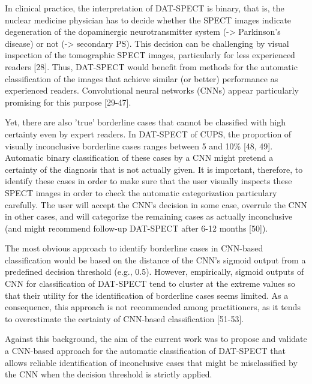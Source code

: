 In clinical practice, the interpretation of DAT-SPECT is binary, that is, the nuclear medicine physician has to decide whether the SPECT images 
indicate degeneration of the dopaminergic neurotransmitter system (-> Parkinson's disease) or not (-> secondary PS). 
This decision can be challenging by visual inspection of the tomographic SPECT images, particularly for less experienced readers [28]. 
Thus, DAT-SPECT would benefit from methods for the automatic classification of the images that achieve similar (or better) performance as experienced readers. 
Convolutional neural networks (CNNs) appear particularly promising for this purpose [29-47].

Yet, there are also 'true' borderline cases that cannot be classified with high certainty even by expert readers. 
In DAT-SPECT of CUPS, the proportion of visually inconclusive borderline cases ranges between 5 and 10\% [48, 49]. 
Automatic binary classification of these cases by a CNN might pretend a certainty of the diagnosis that is not actually given. 
It is important, therefore, to identify these cases in order to make sure that the user visually inspects these SPECT images 
in order to check the automatic categorization particulary carefully. 
The user will accept the CNN's decision in some case, overrule the CNN in other cases, and will categorize the remaining cases as 
actually inconclusive (and might recommend follow-up DAT-SPECT after 6-12 months [50]). 

The most obvious approach to identify borderline cases in CNN-based classification would be based on the distance of the CNN's sigmoid output from a predefined decision threshold (e.g., 0.5). 
However, empirically, sigmoid outputs of CNN for classification of DAT-SPECT tend to cluster at the extreme values so that their utility for the identification of borderline cases seems limited.  
As a consequence, this approach is not recommended among practitioners, as it tends to overestimate the certainty of CNN-based classification [51-53].


Against this background, the aim of the current work was to propose and validate a CNN-based approach for the automatic classification of DAT-SPECT 
that allows reliable identification of inconclusive cases that might be misclassified by the CNN when the decision threshold is strictly applied. 


